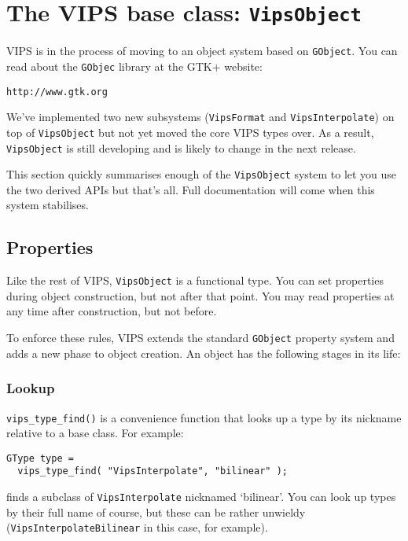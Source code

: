 \section{The VIPS base class: \texttt{VipsObject}}
\label{sec:object}

VIPS is in the process of moving to an object system based on \verb+GObject+.
You can read about the \verb+GObjec+ library at the GTK+ website:

\begin{verbatim}
http://www.gtk.org
\end{verbatim}

We've implemented two new subsystems (\verb+VipsFormat+ and
\verb+VipsInterpolate+) on top of \verb+VipsObject+ but not yet moved the core
VIPS types over. As a result, \verb+VipsObject+ is still developing and is
likely to change in the next release.

This section quickly summarises enough of the \verb+VipsObject+ system to let
you use the two derived APIs but that's all. Full documentation will come when
this system stabilises.

\subsection{Properties}

Like the rest of VIPS, \verb+VipsObject+ is a functional type. You can set
properties during object construction, but not after that point. You may read
properties at any time after construction, but not before.

To enforce these rules, VIPS extends the standard \verb+GObject+ property 
system and adds a new phase to object creation. An object has the following
stages in its life:

\subsubsection{Lookup}

\verb+vips_type_find()+ is a convenience function that looks up a type by its
nickname relative to a base class. For example:

\begin{verbatim}
GType type = 
  vips_type_find( "VipsInterpolate", "bilinear" );
\end{verbatim}

\noindent
finds a subclass of \verb+VipsInterpolate+ nicknamed `bilinear'. You can look
up types by their full name of course, but these can be rather unwieldy
(\verb+VipsInterpolateBilinear+ in this case, for example).

